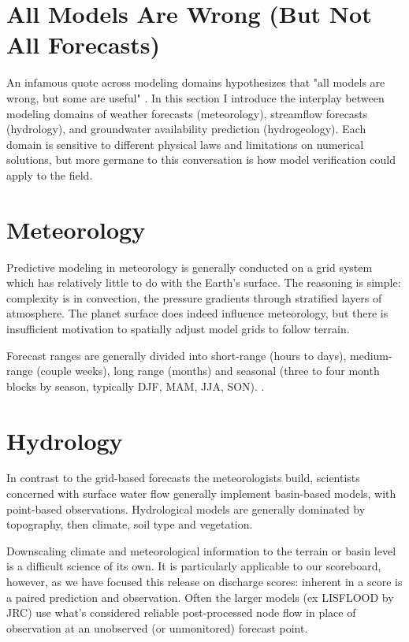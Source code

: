 \section{All Models Are Wrong (But Not All Forecasts)}

An infamous quote across modeling domains hypothesizes that "all models are wrong, but some are useful" \autocite{box2007response}. In this section I introduce the interplay between modeling domains of weather forecasts (meteorology), streamflow forecasts (hydrology), and groundwater availability prediction (hydrogeology). Each domain is sensitive to different physical laws and limitations on numerical solutions, but more germane to this conversation is how model verification could apply to the field.
%
%

\section{Meteorology}

Predictive modeling in meteorology is generally conducted on a grid system which has relatively little to do with the Earth's surface. The reasoning is simple: complexity is in convection, the pressure gradients through stratified layers of atmosphere. The planet surface does indeed influence meteorology, but there is insufficient motivation to spatially adjust model grids to follow terrain.

Forecast ranges are generally divided into short-range (hours to days), medium-range (couple weeks), long range (months) and seasonal (three to four month blocks by season, typically DJF, MAM, JJA, SON).  \autocite{JolliffeIanT.andStephenson2012ForecastVerification}.

\section{Hydrology}

In contrast to the grid-based forecasts the meteorologists build, scientists concerned with surface water flow generally implement basin-based models, with point-based observations. Hydrological models are generally dominated by topography, then climate, soil type and vegetation. 

Downscaling climate and meteorological information to the terrain or basin level is a difficult science of its own. It is particularly applicable to our scoreboard, however, as we have focused this release on discharge scores: inherent in a score is a paired prediction and observation. Often the larger models (ex LISFLOOD by JRC) use what's considered reliable post-processed node flow in place of observation at an unobserved (or unmonitored) forecast point.

